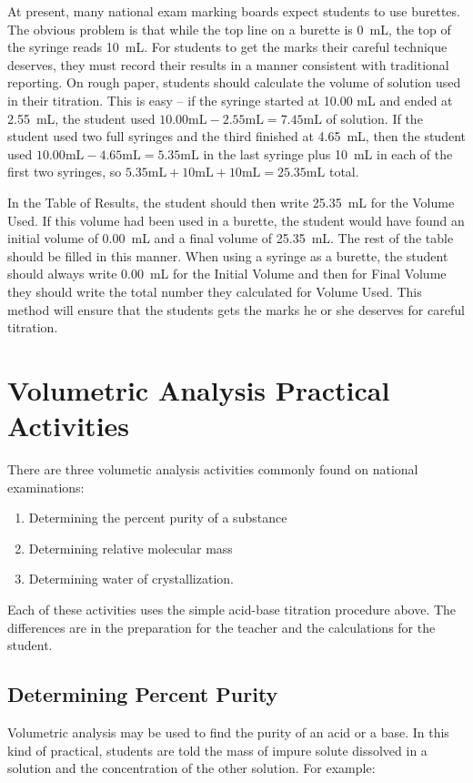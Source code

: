 At present, many national exam marking boards expect students to use burettes. The obvious problem is that while the top line on a burette is 0~mL, the top of the syringe reads 10~mL. For students to get the marks their careful technique deserves, they must record their results in a manner consistent with traditional reporting. On rough paper, students should calculate the volume of solution used in their titration. This is easy -- if the syringe started at 10.00 mL and ended at 2.55~mL, the student used $10.00 \mathrm{mL} - 2.55 \mathrm{mL} = 7.45 \mathrm{mL}$ of solution. If the student used two full syringes and the third finished at 4.65~mL, then the student used $10.00 \mathrm{mL} - 4.65 \mathrm{mL} = 5.35 \mathrm{mL}$ in the last syringe plus 10~mL in each of the first two syringes, so $5.35 \mathrm{mL} + 10 \mathrm{mL} + 10 \mathrm{mL} = 25.35 \mathrm{mL}$ total.

In the Table of Results, the student should then write 25.35~mL for the Volume Used. If this volume had been used in a burette, the student would have found an initial volume of 0.00~mL and a final volume of 25.35~mL. The rest of the table should be filled in this manner. When using a syringe as a burette, the student should always write 0.00~mL for the Initial Volume and then for Final Volume they should write the total number they calculated for Volume Used. This method will ensure that the students gets the marks he or she deserves for careful titration. 

\section{Volumetric Analysis Practical Activities}

There are three volumetic analysis activities commonly found on national examinations: 
\begin{enumerate}
\item{Determining the percent purity of a substance}
\item{Determining relative molecular mass}
\item{Determining water of crystallization.}
\end{enumerate}
 Each of these activities uses the simple acid-base titration procedure above. The differences are in the preparation for the teacher and the calculations for the student.

\subsection{Determining Percent Purity}
Volumetric analysis may be used to find the purity of an acid or a base. In this kind of practical, students are told the mass of impure solute dissolved in a solution and the concentration of the other solution. 
For example: \\

